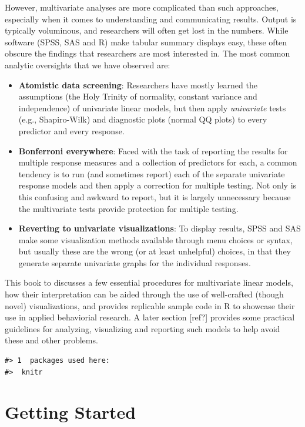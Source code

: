 \documentclass[
  letterpaper,
  10pt,
  krantz2]{krantz}
\begin{document}
However, multivariate analyses are more complicated than such
approaches, especially when it comes to understanding and communicating
results. Output is typically voluminous, and researchers will often get
lost in the numbers. While software (SPSS, SAS and R) make tabular
summary displays easy, these often obscure the findings that researchers
are most interested in. The most common analytic oversights that we have
observed are:

\begin{itemize}
\item
  \textbf{Atomistic data screening}: Researchers have mostly learned the
  assumptions (the Holy Trinity of normality, constant variance and
  independence) of univariate linear models, but then apply
  \emph{univariate} tests (e.g., Shapiro-Wilk) and diagnostic plots
  (normal QQ plots) to every predictor and every response.
\item
  \textbf{Bonferroni everywhere}: Faced with the task of reporting the
  results for multiple response measures and a collection of predictors
  for each, a common tendency is to run (and sometimes report) each of
  the separate univariate response models and then apply a correction
  for multiple testing. Not only is this confusing and awkward to
  report, but it is largely unnecessary because the multivariate tests
  provide protection for multiple testing.
\item
  \textbf{Reverting to univariate visualizations}: To display results,
  SPSS and SAS make some visualization methods available through menu
  choices or syntax, but usually these are the wrong (or at least
  unhelpful) choices, in that they generate separate univariate graphs
  for the individual responses.
\end{itemize}

This book to discusses a few essential procedures for multivariate
linear models, how their interpretation can be aided through the use of
well-crafted (though novel) visualizations, and provides replicable
sample code in R to showcase their use in applied behaviorial research.
A later section {[}ref?{]} provides some practical guidelines for
analyzing, visualizing and reporting such models to help avoid these and
other problems.

\begin{verbatim}
#> 1  packages used here:
#>  knitr
\end{verbatim}


\chapter{Getting Started}\label{sec-getting_started}
\end{document}
